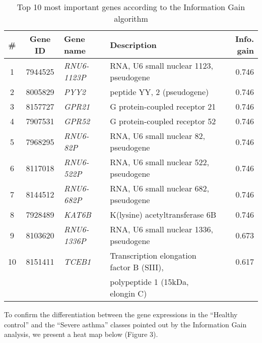 \begin{table}[htbp]
  \centering
  \caption{Top 10 most important genes according to the Information Gain algorithm}
  \begin{tabular}{ccllr}
    \hline
    \# & \textbf{Gene ID} & \textbf{Gene name}  & \textbf{Description}                      & \textbf{Info. gain} \\
    \hline
    1  & 7944525          & \textit{RNU6-1123P} & RNA, U6 small nuclear 1123, pseudogene    & 0.746               \\
    2  & 8005829          & \textit{PYY2}       & peptide YY, 2 (pseudogene)                & 0.746               \\
    3  & 8157727          & \textit{GPR21}      & G protein-coupled receptor 21             & 0.746               \\
    4  & 7907531          & \textit{GPR52}      & G protein-coupled receptor 52             & 0.746               \\
    5  & 7968295          & \textit{RNU6-82P}   & RNA, U6 small nuclear 82, pseudogene      & 0.746               \\
    6  & 8117018          & \textit{RNU6-522P}  & RNA, U6 small nuclear 522, pseudogene     & 0.746               \\
    7  & 8144512          & \textit{RNU6-682P}  & RNA, U6 small nuclear 682, pseudogene     & 0.746               \\
    8  & 7928489          & \textit{KAT6B}      & K(lysine) acetyltransferase 6B            & 0.746               \\
    9  & 8103620          & \textit{RNU6-1336P} & RNA, U6 small nuclear 1336, pseudogene    & 0.673               \\
    10 & 8151411          & \textit{TCEB1}      & Transcription elongation factor B (SIII), & 0.617               \\
       &                  &                     & polypeptide 1 (15kDa, elongin C)          &                     \\
    \hline
  \end{tabular}
\end{table}

To confirm the differentiation between the gene expressions in the “Healthy control” and the “Severe asthma” classes pointed out by the Information Gain analysis, we present a heat map below (Figure 3).



